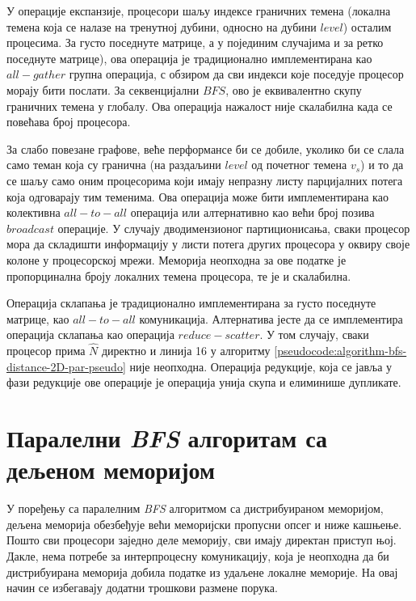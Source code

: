 \par
У операције експанзије, процесори шаљу индексе граничних темена (локална темена која се налазе на тренутној дубини, односно на дубини $level$) осталим процесима. За густо поседнуте матрице, а у појединим случајима и за ретко поседнуте матрице), ова операција је традиционално имплементирана као $all-gather$ групна операција, с обзиром да сви индекси које поседује процесор морају бити послати. За секвенцијални $BFS$, ово је еквивалентно скупу граничних темена у глобалу. Ова операција нажалост није скалабилна када се повећава број процесора.

\par
За слабо повезане графове, веће перформансе би се добиле, уколико би се слала само теман која су гранична (на раздаљини $level$
од почетног темена $v_s$) и то да се шаљу само оним процесорима који имају непразну листу парцијалних потега која одговарају тим теменима. Ова операција може бити имплементирана као колективна $all-to-all$ операција или алтернативно као већи број позива $broadcast$ операције. У случају дводимензионог партиционисања, сваки процесор мора да складишти информацију у листи потега других процесора у оквиру своје колоне у процесорској мрежи. Меморија неопходна за ове податке је пропорцинална броју локалних темена процесора, те је и скалабилна.

\par
Операција склапања је традиционално имплементирана за густо поседнуте матрице, као $all-to-all$ комуникација. Алтернатива јесте да се имплементира операција склапања као операција $reduce-scatter$. У том случају, сваки процесор прима $\widehat{N}$ директно и линија 16 у алгоритму \ref{pseudocode:algorithm-bfs-distance-2D-par-pseudo} није неопходна. Операција редукције, која се јавља у фази редукције ове операције је операција унија скупа и елиминише дупликате.

\section{Паралелни \textit{BFS} алгоритам са дељеном меморијом}
У поређењу са паралелним \textit{BFS} алгоритмом са дистрибуираном меморијом, дељена меморија обезбеђује већи меморијски пропусни опсег и ниже кашњење. Пошто сви процесори заједно деле меморију, сви имају директан приступ њој. Дакле, нема потребе за интерпроцесну комуникацију, која је неопходна да би дистрибуирана меморија добила податке из удаљене локалне меморије. На овај начин се избегавају додатни трошкови размене порука.

